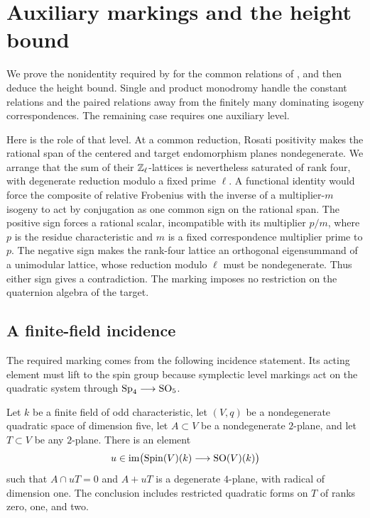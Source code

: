 \section{Auxiliary markings and the height bound}\label{sec:height}

We prove the nonidentity required by  for the
common relations of , and then deduce the
height bound.  Single and product monodromy handle the constant relations
and the paired relations away from the finitely many dominating isogeny
correspondences.  The remaining case requires one auxiliary level.

Here is the role of that level.  At a common reduction, Rosati positivity
makes the rational span of the centered and target endomorphism planes
nondegenerate.  We arrange that the sum of their $\mathbb Z_\ell$-lattices is
nevertheless saturated of rank four, with degenerate reduction modulo
a fixed prime $\ell$.  A functional identity would force the composite
of relative Frobenius with the inverse of a multiplier-$m$ isogeny
to act by conjugation as one common sign on the rational span.  The positive
sign forces a rational scalar, incompatible with its multiplier $p/m$,
where $p$ is the residue characteristic and $m$ is a fixed
correspondence multiplier prime to $p$.  The negative sign makes the rank-four
lattice an orthogonal eigensummand of a unimodular lattice, whose
reduction modulo $\ell$ must be nondegenerate.  Thus either sign gives
a contradiction.  The marking imposes no restriction on the quaternion
algebra of the target.

\subsection{A finite-field incidence}

The required marking comes from the following incidence statement.
Its acting element must lift to the spin group because symplectic
level markings act on the quadratic system through
$\operatorname{Sp}_4\longrightarrow\operatorname{SO}_5$.

\begin{lemma}\label{lem:finite-field-incidence}
Let $k$ be a finite field of odd characteristic, let $(V,q)$ be a nondegenerate
quadratic space of dimension five, let $A\subset V$ be a nondegenerate
$2$-plane, and let $T\subset V$ be any $2$-plane.  There is an element
\[
 u\in\operatorname{im}\bigl(\operatorname{Spin}(V)(k)\longrightarrow\operatorname{SO}(V)(k)\bigr)
\]
such that $A\cap uT=0$ and $A+uT$ is a degenerate $4$-plane, with radical
of dimension one.  The conclusion includes restricted quadratic forms on
$T$ of ranks zero, one, and two.
\end{lemma}

